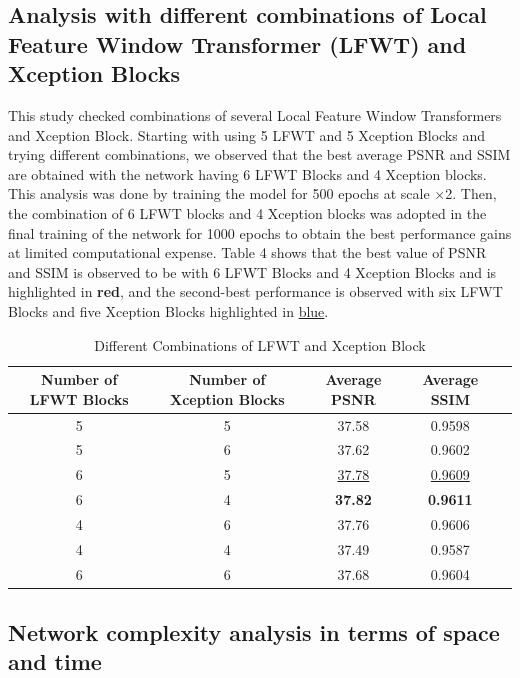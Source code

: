\documentclass[twocolumn]{svjour3}          %
\begin{document}
\subsection{Analysis with different combinations of Local Feature Window Transformer (LFWT) and Xception Blocks}

This study checked combinations of several Local Feature Window Transformers and Xception Block. Starting with using 5 LFWT and 5 Xception Blocks and trying different combinations, we observed that the best average PSNR and SSIM are obtained with the network having 6 LFWT Blocks and 4 Xception blocks. This analysis was done by training the model for 500 epochs at scale ×2. Then, the combination of 6 LFWT blocks and 4 Xception blocks was adopted in the final training of the network for 1000 epochs to obtain the best performance gains at limited computational expense. Table 4 shows that the best value of PSNR and SSIM is observed to be with 6 LFWT Blocks and 4 Xception Blocks and is highlighted in {\color{red}\textbf{red}}, and the second-best performance is observed with six LFWT Blocks and five Xception Blocks highlighted in {\color{blue}\underline{blue}}.

\begin{table}
  \centering
  \caption{Different Combinations of LFWT and Xception Block}
  \setlength{\tabcolsep}{3 pt}
  \begin{tabular}{|c|c|c|c|c|} %
    \hline
    \textbf{Number of LFWT Blocks} & \textbf{Number of Xception Blocks} & \textbf{Average PSNR} & \textbf{Average SSIM} \\
    \hline
    5   & 5   & 37.58   & 0.9598   \\
    5   & 6   & 37.62   & 0.9602   \\
    6   & 5   & {\color{blue}\underline{37.78}}   & {\color{blue}\underline{0.9609}}   \\
    6   & 4   & {\color{red}\textbf{37.82}}   & {\color{red}\textbf{0.9611}}   \\
    4   & 6   & 37.76   & 0.9606   \\    
    4   & 4   & 37.49   & 0.9587   \\
    6   & 6   & 37.68   & 0.9604   \\
    \hline
  \end{tabular}
\end{table}

\subsection{Network complexity analysis in terms of space and time}
\end{document}
